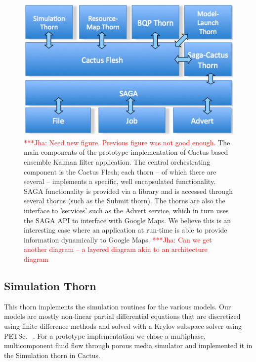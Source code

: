 \documentclass[conference,final]{IEEEtran}
\newcommand{\jhanote}[1]{ {\textcolor{red} { ***Jha: #1 }}}
\begin{document}
\begin{figure}
\begin{center}
\includegraphics[scale=0.34]{./figures/kalmanfilterlayer.png}
\end{center}
\caption{\jhanote{Need new figure. Previous figure was not good enough.}
  The main components of the prototype implementation of Cactus
  based ensemble Kalman filter application. The central orchestrating
  component is the Cactus Flesh; each thorn -- of which there are
  several -- implements a specific, well encapsulated functionality.
  SAGA functionality is provided via a library and is accessed through
  several thorns (such as the Submit thorn).  The thorns are also the
  interface to 'services' such as the Advert service, which in turn
  uses the SAGA API to interface with Google Maps. We believe this is
  an interesting case where an application at run-time is able to
  provide information dynamically to Google Maps. \jhanote{Can we get
    another diagram -- a layered diagram akin to an architecture
    diagram}}
\label{fig:application_architecture}
\end{figure}


\subsection{Simulation Thorn}

This thorn implements the simulation routines for the various models.
Our models are mostly non-linear partial differential equations that
are discretized using finite difference methods and solved with a
Krylov subspace solver using PETSc. ~\cite{PETSc}. For a prototype
implementation we chose a multiphase, multicomponent fluid flow
through porous media simulator and implemented it in the Simulation
thorn in Cactus.
\end{document}
